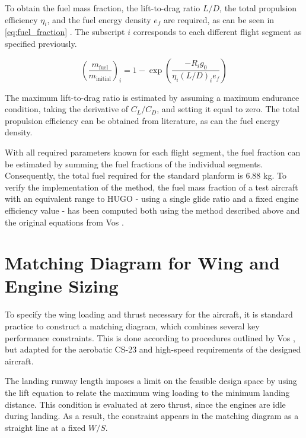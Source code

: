 
To obtain the fuel mass fraction, the lift-to-drag ratio $L/D$, the total propulsion efficiency $\eta_i$, and the fuel energy density $e_f$ are required, as can be seen in \autoref{eq:fuel_fraction} \cite{Vos}. The subscript $i$ corresponds to each different flight segment as specified previously.

\begin{equation}
\label{eq:fuel_fraction}
    \left(\frac{m_\text{fuel}}{m_\text{initial}}\right)_i = 1-\exp\left(\frac{-R_ig_0}{\eta_i (L/D)_i e_f}\right)
\end{equation}

The maximum lift-to-drag ratio is estimated by assuming a maximum endurance condition, taking the derivative of $C_L/C_D$, and setting it equal to zero. The total propulsion efficiency can be obtained from literature, as can the fuel energy density.

With all required parameters known for each flight segment, the fuel fraction can be estimated by summing the fuel fractions of the individual segments. Consequently, the total fuel required for the standard planform is 6.88 kg. To verify the implementation of the method, the fuel mass fraction of a test aircraft with an equivalent range to HUGO - using a single glide ratio and a fixed engine efficiency value - has been computed both using the method described above and the original equations from Vos \cite{Vos}.

\section{Matching Diagram for Wing and Engine Sizing}
\label{sec:climb_performance}

To specify the wing loading and thrust necessary for the aircraft, it is standard practice to construct a matching diagram, which combines several key performance constraints. This is done according to procedures outlined by Vos \cite{Vos}, but adapted for the aerobatic CS-23 and high-speed requirements of the designed aircraft.

The landing runway length imposes a limit on the feasible design space by using the lift equation to relate the maximum wing loading to the minimum landing distance. This condition is evaluated at zero thrust, since the engines are idle during landing. As a result, the constraint appears in the matching diagram as a straight line at a fixed $W/S$.

